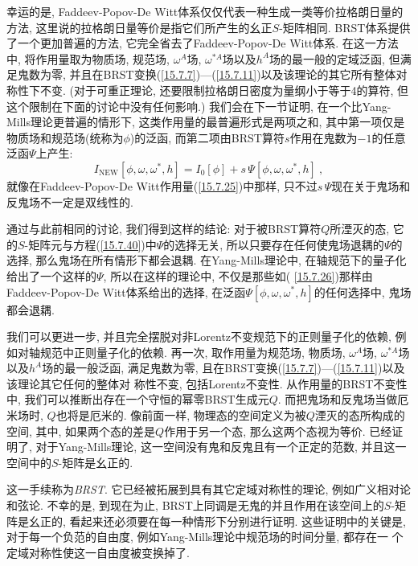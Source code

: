 幸运的是, Faddeev-Popov-De Witt体系仅仅代表一种生成一类等价拉格朗日量的方法, 这里说的拉格朗日量等价是指它们所产生的幺正$S$-矩阵相同. BRST体系提供了一个更加普遍的方法, 它完全省去了Faddeev-Popov-De Witt体系. 在这一方法中, 将作用量取为物质场, 规范场, $\omega ^{A}$场, $\omega ^{\ast A}$场以及$h^{A}$场的最一般的定域泛函, 但满足鬼数为零, 并且在BRST变换(\ref{15.7.7})---(\ref{15.7.11})以及该理论的其它所有整体对称性下不变. (对于可重正理论, 还要限制拉格朗日密度为量纲小于等于4的算符, 但这个限制在下面的讨论中没有任何影响.) 我们会在下一节证明, 在一个比Yang-Mills理论更普遍的情形下, 这类作用量的最普遍形式是两项之和, 其中第一项仅是物质场和规范场(统称为$\phi $)的泛函, 而第二项由BRST算符$s$作用在鬼数为$-1$的任意泛函$\Psi $上产生:%
\begin{equation}
I_{\mathrm{NEW}}[\phi ,\omega ,\omega ^{\ast },h]=I_{0}[\phi ]+s\,\Psi [
\phi ,\omega ,\omega ^{\ast },h]\:,   \label{15.7.40}
\end{equation}%
就像在Faddeev-Popov-De Witt作用量(\ref{15.7.25})中那样, 只不过$s\,\Psi $现在关于鬼场和反鬼场不一定是双线性的.

通过与此前相同的讨论, 我们得到这样的结论: 对于被BRST算符$Q$所湮灭的态, 它的$S$-矩阵元与方程(\ref{15.7.40})中$\Psi $的选择无关, 所以只要存在任何使鬼场退耦的$\Psi $的选择, 那么鬼场在所有情形下都会退耦. 在Yang-Mills理论中, 在轴规范下的量子化给出了一个这样的$\Psi $, 所以在这样的理论中, 不仅是那些如(%
\ref{15.7.26})那样由Faddeev-Popov-De Witt体系给出的选择, 在泛函$\Psi [ \phi ,\omega ,\omega ^{\ast },h]$的任何选择中, 鬼场都会退耦.

我们可以更进一步, 并且完全摆脱对非Lorentz不变规范下的正则量子化的依赖, 例如对轴规范中正则量子化的依赖. 再一次, 取作用量为规范场, 物质场, $\omega ^{A}$场, $\omega ^{\ast A}$场以及$h^{A}$场的最一般泛函, 满足鬼数为零, 且在BRST变换(\ref{15.7.7})---(\ref{15.7.11})以及该理论其它任何的整体对%
称性不变, 包括Lorentz不变性. 从作用量的BRST不变性中,
我们可以推断出存在一个守恒的幂零BRST生成元$Q$. 而把鬼场和反鬼场当做厄米场时, $Q$也将是厄米的. 像前面一样, 物理态的空间定义为被$Q$湮灭的态所构成的空间, 其中, 如果两个态的差是$Q$作用于另一个态, 那么这两个态视为等价. 已经证明了, 对于Yang-Mills理论, 这一空间没有鬼和反鬼且有一个正定的范数, 并且这一空间中的$S$-矩阵是幺正的.

这一手续称为\textit{BRST}{}. 它已经被拓展到具有其它定域对称性的理论, 例如广义相对论和弦论. 不幸的是, 到现在为止, BRST上同调是无鬼的并且作用在该空间上的$S$-矩阵是幺正的, 看起来还必须要在每一种情形下分别进行证明. 这些证明中的关键是, 对于每一个负范的自由度, 例如Yang-Mills理论中规范场的时间分量, 都存在一%
个定域对称性使这一自由度被变换掉了.

